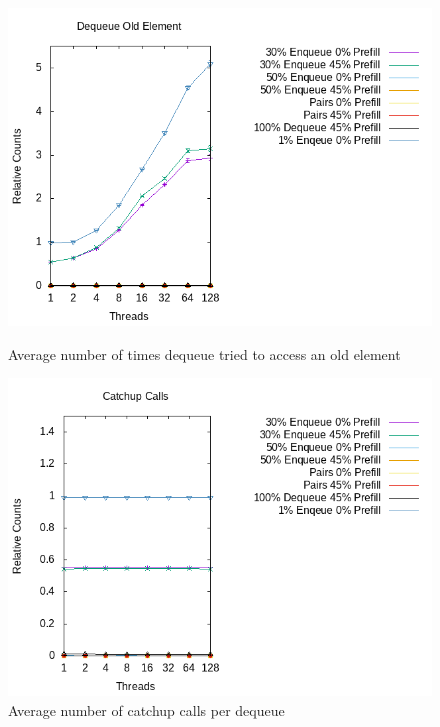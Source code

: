 \documentclass{article}      %
\begin{document}
\begin{figure}[H]
	\centering
	
	\includegraphics[width=\textwidth]{Pictures/diss_deq_old.png}
	\caption{Average number of times dequeue tried to access an old element}
	\label{fig:diss_deq_old}
	\endminipage\hfill
	\includegraphics[width=\textwidth]{Pictures/diss_deq_catchup.png}
	\caption{Average number of catchup calls per dequeue}
	\label{fig:diss_catchup}
	\endminipage\hfill
\end{figure}
\end{document}
